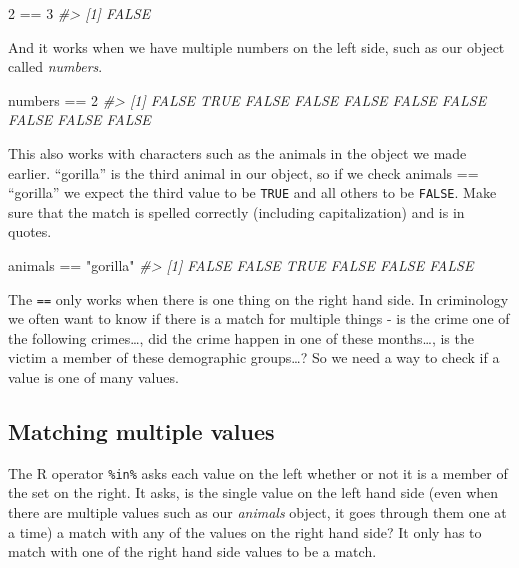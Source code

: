 \documentclass[
  12pt,
]{book}
\newenvironment{Shaded}{\begin{snugshade}}{\end{snugshade}}
\newcommand{\CommentTok}[1]{\textcolor[rgb]{0.37,0.37,0.37}{\textit{#1}}}
\newcommand{\DecValTok}[1]{\textcolor[rgb]{0.06,0.06,0.06}{#1}}
\newcommand{\NormalTok}[1]{#1}
\newcommand{\SpecialCharTok}[1]{\textcolor[rgb]{0,0,0}{#1}}
\newcommand{\StringTok}[1]{\textcolor[rgb]{0.5,0.5,0.5}{#1}}
\begin{document}
\begin{Shaded}
\begin{Highlighting}[]
\DecValTok{2} \SpecialCharTok{==} \DecValTok{3}
\CommentTok{\#\textgreater{} [1] FALSE}
\end{Highlighting}
\end{Shaded}

And it works when we have multiple numbers on the left side, such as our object called \emph{numbers}.

\begin{Shaded}
\begin{Highlighting}[]
\NormalTok{numbers }\SpecialCharTok{==} \DecValTok{2}
\CommentTok{\#\textgreater{}  [1] FALSE  TRUE FALSE FALSE FALSE FALSE FALSE FALSE FALSE FALSE}
\end{Highlighting}
\end{Shaded}

This also works with characters such as the animals in the object we made earlier. ``gorilla'' is the third animal in our object, so if we check animals == ``gorilla'' we expect the third value to be \texttt{TRUE} and all others to be \texttt{FALSE}. Make sure that the match is spelled correctly (including capitalization) and is in quotes.

\begin{Shaded}
\begin{Highlighting}[]
\NormalTok{animals }\SpecialCharTok{==} \StringTok{"gorilla"}
\CommentTok{\#\textgreater{} [1] FALSE FALSE  TRUE FALSE FALSE FALSE}
\end{Highlighting}
\end{Shaded}

The \texttt{==} only works when there is one thing on the right hand side. In criminology we often want to know if there is a match for multiple things - is the crime one of the following crimes\ldots, did the crime happen in one of these months\ldots, is the victim a member of these demographic groups\ldots? So we need a way to check if a value is one of many values.

\hypertarget{matching-multiple-values}{%
\subsection{Matching multiple values}\label{matching-multiple-values}}

The R operator \texttt{\%in\%} asks each value on the left whether or not it is a member of the set on the right. It asks, is the single value on the left hand side (even when there are multiple values such as our \emph{animals} object, it goes through them one at a time) a match with any of the values on the right hand side? It only has to match with one of the right hand side values to be a match.
\end{document}
